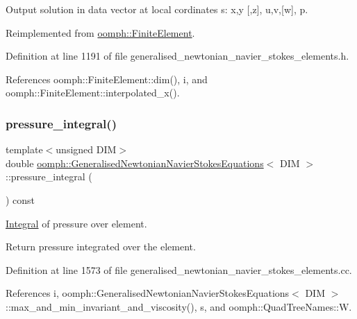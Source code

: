 Output solution in data vector at local cordinates s\+: x,y \mbox{[},z\mbox{]}, u,v,\mbox{[}w\mbox{]}, p. 



Reimplemented from \hyperlink{classoomph_1_1FiniteElement_a8bf3f75b55d4e67b644df3e22c192596}{oomph\+::\+Finite\+Element}.



Definition at line 1191 of file generalised\+\_\+newtonian\+\_\+navier\+\_\+stokes\+\_\+elements.\+h.



References oomph\+::\+Finite\+Element\+::dim(), i, and oomph\+::\+Finite\+Element\+::interpolated\+\_\+x().

\mbox{\label{classoomph_1_1GeneralisedNewtonianNavierStokesEquations_a3240c1554d001b3bff60c1cc90d74836}} 
\subsubsection{\texorpdfstring{pressure\+\_\+integral()}{pressure\_integral()}}
{\footnotesize\ttfamily template$<$unsigned D\+IM$>$ \\
double \hyperlink{classoomph_1_1GeneralisedNewtonianNavierStokesEquations}{oomph\+::\+Generalised\+Newtonian\+Navier\+Stokes\+Equations}$<$ D\+IM $>$\+::pressure\+\_\+integral (\begin{DoxyParamCaption}{ }\end{DoxyParamCaption}) const}



\hyperlink{classoomph_1_1Integral}{Integral} of pressure over element. 

Return pressure integrated over the element. 

Definition at line 1573 of file generalised\+\_\+newtonian\+\_\+navier\+\_\+stokes\+\_\+elements.\+cc.



References i, oomph\+::\+Generalised\+Newtonian\+Navier\+Stokes\+Equations$<$ D\+I\+M $>$\+::max\+\_\+and\+\_\+min\+\_\+invariant\+\_\+and\+\_\+viscosity(), s, and oomph\+::\+Quad\+Tree\+Names\+::W.


